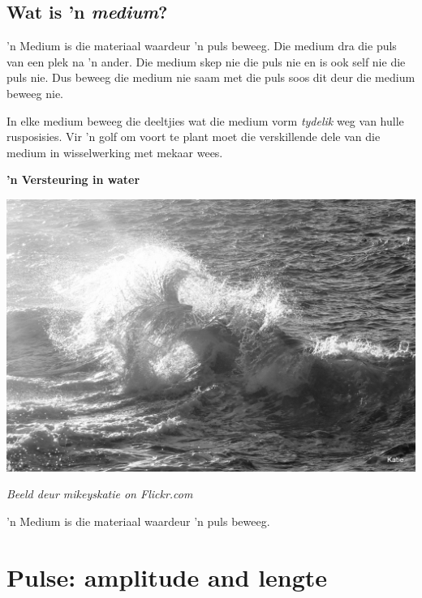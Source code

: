 \subsection*{Wat is 'n \textsl{medium}?}
            \nopagebreak
\begin{minipage}{.5\textwidth}

'n Medium is die materiaal waardeur 'n puls beweeg. Die medium dra die puls van een plek na 'n ander. Die medium skep nie die puls nie en is ook self nie die puls nie. Dus beweeg die medium nie saam met die puls soos dit deur die medium beweeg nie.

In elke medium beweeg die deeltjies wat die medium vorm \textit{tydelik} weg van hulle rusposisies. Vir 'n golf om voort te plant moet die verskillende dele van die medium in wisselwerking met mekaar wees.
\end{minipage}
\begin{minipage}{.5\textwidth}
\begin{center}
\textbf{'n Versteuring in water}\par
 \includegraphics[width=.8\textwidth]{photos/waveby-mikeyskatie-flickr.jpg}\par
\textit{\small Beeld deur mikeyskatie on Flickr.com}
\end{center}
\end{minipage}


\label{m38801*fhsst!!!underscore!!!id51}


\pagebreak      
    \label{m38801*cid4}
 { \label{m38801*meaningfhsst!!!underscore!!!id51}
      \label{m38801*id312830}'n Medium is die materiaal waardeur 'n puls beweeg.\par 
       } 
           
\section{Pulse: amplitude and lengte}

